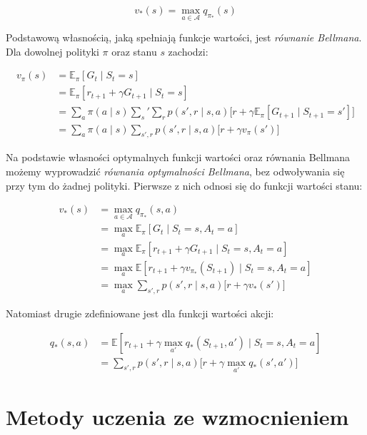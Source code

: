 \documentclass[licencjacka]{pracamgr}
\begin{document}
$$ v_{\ast}(s) = \max_{a \in \mathcal{A}} q_{\pi_{\ast}}(s) $$

Podstawową własnością, jaką spełniają funkcje wartości, jest \emph{równanie Bellmana}. Dla dowolnej polityki $\pi$ oraz stanu $s$ zachodzi:

\begin{align}
v_{\pi}(s) &= \mathbb{E}_{\pi}[G_t \mid S_t = s]  \nonumber \\
&= \mathbb{E}_{\pi}[r_{t+1} + \gamma G_{t+1} \mid S_t = s] \nonumber \\
&= \sum_a \pi(a \mid s) \sum_s' \sum_r p(s', r \mid s, a) \Big[r + \gamma \mathbb{E}_{\pi}[G_{t+1} \mid S_{t+1} = s' ]\Big] \nonumber \\
&= \sum_a \pi(a \mid s) \sum_{s', r} p(s', r \mid s, a) \Big[r + \gamma v_{\pi}(s') \Big]
\end{align}

Na podstawie własności optymalnych funkcji wartości oraz równania Bellmana możemy wyprowadzić \emph{równania optymalności Bellmana}, bez odwoływania się przy tym do żadnej polityki. Pierwsze z nich odnosi się do funkcji wartości stanu:

\begin{align}
v_{\ast}(s) &= \max_{a \in \mathcal{A}} q_{\pi_{\ast}}(s, a) \nonumber \\
&= \max_a \mathbb{E}_{\pi}[G_t \mid S_t = s, A_t = a]  \nonumber \\
&= \max_a \mathbb{E}_{\pi}[r_{t+1} + \gamma G_{t+1} \mid S_t = s, A_t = a] \nonumber \\
&= \max_a \mathbb{E}[r_{t+1} + \gamma v_{\pi_{\ast}}(S_{t+1}) \mid S_t = s, A_t = a] \nonumber \\
&= \max_a \sum_{s', r} p(s', r \mid s, a) \Big[r + \gamma v_{\ast}(s') \Big]
\end{align}

Natomiast drugie zdefiniowane jest dla funkcji wartości akcji:

\begin{align}
q_{\ast}(s, a) &= \mathbb{E}[r_{t+1} + \gamma \max_{a'} q_{\ast} (S_{t+1}, a') \mid S_t = s, A_t = a] \nonumber \\
&= \sum_{s', r} p(s', r \mid s, a) \Big[r + \gamma \max_{a'} q_{\ast} (s', a') \Big]
\end{align}

\section{Metody uczenia ze wzmocnieniem}
\end{document}
